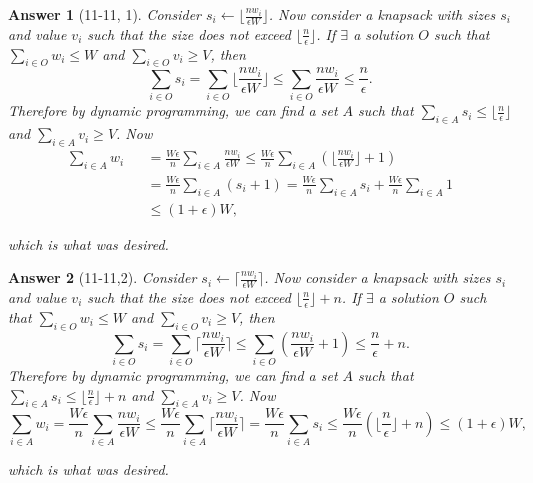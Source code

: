\documentclass[11pt]{article}
\theoremstyle{numberplain}
\theoremstyle{nonumberplain}
\newtheorem{ans}{Answer}
\newcommand{\0}{{\mathbf{0}}}
\begin{document}
\begin{ans}[11-11, 1] Consider $s_i\leftarrow \lfloor  \frac{nw_i}{\epsilon W}
\rfloor$. Now consider a knapsack with sizes $s_i$ and value $v_i$ such that the size does not exceed $\lfloor \frac{n}{\epsilon} \rfloor$. If $\exists$ a solution $O$ such that $\sum_{i\in O}w_i\leq W$ and $\sum_{i\in O}v_i\geq V$, then 
$$
\sum_{i\in O}s_i = \sum_{i\in O}\lfloor \frac{nw_i}{\epsilon W}\rfloor \leq  \sum_{i\in O}\frac{nw_i}{\epsilon W}\leq \frac{n}{\epsilon}.
$$
Therefore by dynamic programming, we can find a set $A$ such that $\sum_{i\in A}s_i\leq \lfloor \frac{n}{\epsilon} \rfloor$ and $
\sum_{i\in A}v_i\geq V$. Now
\begin{eqnarray*}
\sum_{i\in A}w_i && =\frac{W\epsilon}{n}\sum_{i\in A}\frac{nw_i}{\epsilon W} \leq  \frac{W\epsilon}{n}\sum_{i\in A}\left(\lfloor \frac{nw_i}{\epsilon W}\rfloor+1\right) \\
&& = \frac{W\epsilon}{n}\sum_{i\in A}\left(s_i+1\right) =\frac{W\epsilon}{n} \sum_{i\in A}s_i+\frac{W\epsilon}{n}\sum_{i\in A}1\\
&& \leq (1+\epsilon) W,
\end{eqnarray*}

which is what was desired.
\end{ans}

\begin{ans}[11-11,2] Consider $s_i\leftarrow \lceil  \frac{nw_i}{\epsilon W}
\rceil$. Now consider a knapsack with sizes $s_i$ and value $v_i$ such that the size does not exceed $\lfloor \frac{n}{\epsilon} \rfloor+n$. If $\exists$ a solution $O$ such that $\sum_{i\in O}w_i\leq W$ and $\sum_{i\in O}v_i\geq V$, then 
$$
\sum_{i\in O}s_i = \sum_{i\in O}\lceil \frac{nw_i}{\epsilon W}\rceil \leq  \sum_{i\in O}\left(\frac{nw_i}{\epsilon W}+1\right)\leq \frac{n}{\epsilon}+n.
$$
Therefore by dynamic programming, we can find a set $A$ such that $\sum_{i\in A}s_i\leq \lfloor \frac{n}{\epsilon} \rfloor+n$ and $
\sum_{i\in A}v_i\geq V$. Now
$$
\sum_{i\in A}w_i =\frac{W\epsilon}{n}\sum_{i\in A}\frac{nw_i}{\epsilon W} \leq  \frac{W\epsilon}{n}\sum_{i\in A}\lceil \frac{nw_i}{\epsilon W}\rceil
= \frac{W\epsilon}{n}\sum_{i\in A}s_i\leq \frac{W\epsilon}{n}\left(\lfloor \frac{n}{\epsilon} \rfloor+n\right)  \leq (1+\epsilon) W,
$$

which is what was desired.
\end{ans}
\newpage 
\end{document}
